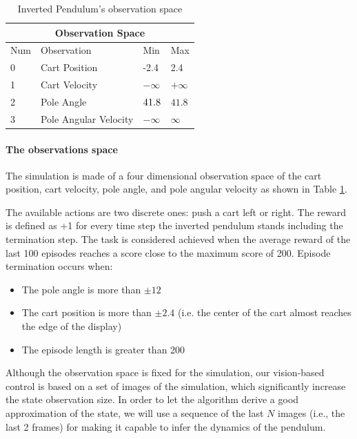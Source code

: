 \documentclass[11pt]{article}
\begin{document}
\begin{table}
	\centering
	\begin{tabular}{ |p{2cm}|p{4cm}|p{2cm}|p{2cm}|  }
		\hline
		\multicolumn{4}{|c|}{Observation Space} \\
		\hline
		Num & Observation & Min & Max \\
		\hline
		0 & Cart Position & -2.4 & 2.4 \\
		1 & Cart Velocity & $-\infty$ & $+\infty$ \\
		2 & Pole Angle & $\-41.8$\textdegree & $41.8$\textdegree \\
		3 & Pole Angular Velocity & $-\infty$ & $\infty$ \\
		\hline
	\end{tabular}
	\label{table:tableenvironment}
	\caption{Inverted Pendulum's observation space}
\end{table}

\paragraph{The observations space} The simulation is made of a four dimensional observation space of the cart position, cart velocity, pole angle, and pole angular velocity as shown in Table \ref{table:tableenvironment}.

 The available actions are two discrete ones: push a cart left or right. The reward is defined as +1 for every time step the inverted pendulum stands including the termination step. The task is considered achieved when the average reward of the last 100 episodes reaches a score close to the maximum score of 200. Episode termination occurs when:

\begin{itemize}
	\item The pole angle is more than $\pm 12$\textdegree
	\item The cart position is more than $\pm 2.4$ (i.e. the center of the cart almost reaches the edge of the display)
	\item The episode length is greater than 200
  \end{itemize}

Although the observation space is fixed for the simulation, our vision-based control is based on a set of images of the simulation, which significantly increase the state observation size. In order to let the algorithm derive a good approximation of the state, we will use a sequence of the last $N$ images (i.e., the last 2 frames) for making it capable to infer the dynamics of the pendulum.
\end{document}
